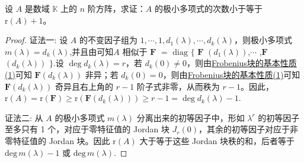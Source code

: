 \documentclass[../../main.tex]{subfiles}
\begin{document}
\begin{proposition}\label{proposition:极小多项式的次数小于等于矩阵的秩加1}
设 $A$ 是数域 $\mathbb{K}$ 上的 $n$ 阶方阵，求证：$A$ 的极小多项式的次数小于等于 $\mathrm{r}(A)+1$。
\end{proposition}
\begin{proof}
{\color{blue}证法一:}
设 $A$ 的不变因子组为 $1,\cdots,1,d_1(\lambda),\cdots,d_k(\lambda)$，则极小多项式 $m(\lambda)=d_k(\lambda)$,并且由可知$A$ 相似于 $\boldsymbol{F}$ $=$ $\mathrm{diag}$ $\{$ $\boldsymbol{F}$ $(d_1(\lambda))$,$\cdots$ ,$\boldsymbol{F}$ $(d_k(\lambda))$ $\}$.设 $\deg d_k(\lambda)=r$，若 $d_k(0)\neq 0$，则由\hyperref[lemma:Frobenius标准型矩阵的极小多项式和不变因子]{Frobenius块的基本性质(1)}可知 $\boldsymbol{F}(d_k(\lambda))$ 非异；若 $d_k(0)=0$，则由\hyperref[lemma:Frobenius标准型矩阵的极小多项式和不变因子]{Frobenius块的基本性质(1)}可知 $\boldsymbol{F}(d_k(\lambda))$ 奇异且右上角的 $r - 1$ 阶子式非零，从而秩为 $r - 1$。因此，$\mathrm{r}(A)=\mathrm{r}(\boldsymbol{F})\geqslant \mathrm{r}(\boldsymbol{F}(d_k(\lambda)))\geqslant  r - 1=\deg d_k(\lambda)-1$.

{\color{blue}证法二:}
从 $A$ 的极小多项式 $m(\lambda)$ 分离出来的初等因子中，形如 $\lambda^r$ 的初等因子至多只有 1 个，对应于零特征值的 Jordan 块 $J_r(0)$，其余的初等因子对应于非零特征值的 Jordan 块。因此 $\mathrm{r}(A)$ 大于等于这些 Jordan 块秩的和，后者等于 $\mathrm{deg}\,m(\lambda) - 1$ 或 $\mathrm{deg}\,m(\lambda)$.
\end{proof}
\end{document}
